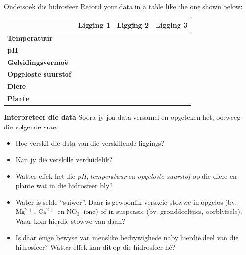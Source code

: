 \begin{Investigation}{Ondersoek die hidrosfeer }
Record your data in a table like the one shown below:
          \begin{table}[H]
        \begin{center}
      \label{m38138*id334712}
    \noindent
      \begin{tabular}{|l|l|l|l|}\hline
         &
        \textbf{Ligging 1} &
        \textbf{Ligging 2} &
        \textbf{Ligging 3} \\ \hline
        \textbf{Temperatuur} &
         &
         &
       \\ \hline
        \textbf{pH} &
         &
         &
      \\ \hline
        \textbf{Geleidingsvermo\"{e}} &
         &
         &
       \\ \hline
        \textbf{Opgeloste suurstof} &
         &
         &
        \\ \hline
        \textbf{Diere} &
         &
         &
        \\ \hline
        \textbf{Plante} &
         &
         &
        \\ \hline
    \end{tabular}
      \end{center}
\end{table}
    \par
  \label{m38138*uid9}\item \textbf{Interpreteer die data}
Sodra jy jou data versamel en opgeteken het, oorweeg die volgende vrae:
\label{m38138*id334958}\begin{itemize}[noitemsep]
            \label{m38138*uid10}\item Hoe verskil die data van die verskillende liggings?
\label{m38138*uid11}\item Kan jy die verskille verduidelik? 
\label{m38138*uid12}\item Watter effek het die \textsl{pH}, \textsl{temperatuur} en \textsl{opgeloste suurstof} op die diere en plante wat in die hidrosfeer bly?
\label{m38138*uid13}\item Water is selde “suiwer”. Daar is gewoonlik verskeie stowwe in opgelos (bv. ${\text{Mg}}^{2+}$, ${\text{Ca}}^{2+}$ en $\text{NO}_{3}^{-}$ ione) of in suspensie (bv. gronddeeltjies, oorblyfsels). Waar kom hierdie stowwe van daan?
\label{m38138*uid14}\item Is daar enige bewyse van menslike bedrywighede naby hierdie deel van die hidrosfeer? Watter effek kan dit op die hidrosfeer h\^{e}?
\end{itemize}
\end{Investigation}


